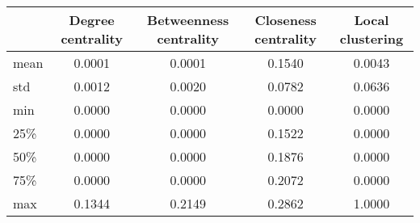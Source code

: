 \begin{tabular}{lcccc}
\toprule
{} &  Degree centrality &  Betweenness centrality &  Closeness centrality &  Local clustering \\
\midrule
mean &             0.0001 &                  0.0001 &                0.1540 &            0.0043 \\
std  &             0.0012 &                  0.0020 &                0.0782 &            0.0636 \\
min  &             0.0000 &                  0.0000 &                0.0000 &            0.0000 \\
25\%  &             0.0000 &                  0.0000 &                0.1522 &            0.0000 \\
50\%  &             0.0000 &                  0.0000 &                0.1876 &            0.0000 \\
75\%  &             0.0000 &                  0.0000 &                0.2072 &            0.0000 \\
max  &             0.1344 &                  0.2149 &                0.2862 &            1.0000 \\
\bottomrule
\end{tabular}
